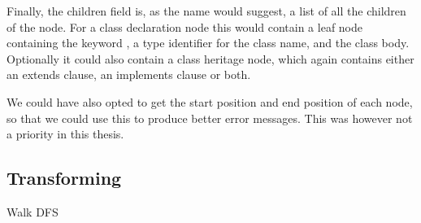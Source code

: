 Finally, the children field is, as the name would suggest, a list of all the children of the node.
For a class declaration node this would contain a leaf node containing the keyword , a type identifier for the class name, and the class body.
Optionally it could also contain a class heritage node, which again contains either an extends clause, an implements clause or both.

We could have also opted to get the start position and end position of each node, so that we could use this to produce better error messages.
This was however not a priority in this thesis.

\subsection{Transforming}\label{subsec:transforming}

Walk DFS